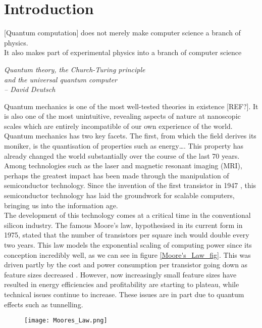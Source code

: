 \section{Introduction}


\epigraph{[Quantum computation] does not merely make computer science
a branch of physics. \\ It also makes part of experimental physics into a branch of computer science}{\textit{Quantum theory, the Church-Turing principle \\ and the universal
quantum computer \\ -- David Deutsch}}

Quantum mechanics is one of the most well-tested theories in existence [REF?]. It is also one of the most unintuitive, revealing aspects of nature at nanoscopic scales which are entirely incompatible of our own experience of the world. \\

Quantum mechanics has two key facets. The first, from which the field derives its moniker, is the quantisation of properties such as energy\ldots. This property has already changed the world substantially over the course of the last 70 years. Among technologies such as the laser and magnetic resonant imaging (MRI), perhaps the greatest impact has been made through the manipulation of semiconductor technology. Since the invention of the first transistor in 1947 \cite{Bardeen1948}, this semiconductor technology has laid the groundwork for scalable computers, bringing us into the information age. \\

The development of this technology comes at a critical time in the conventional silicon industry. The famous Moore's law, hypothesised in its current form in 1975, stated that the number of transistors per square inch would double every two years. This law models the exponential scaling of computing power since its conception incredibly well, as we can see in figure \autoref{Moore's_Law_fig}. This was driven partly by the cost and power consumption per transistor going down as feature sizes decreased \cite{MooresLawEconomist}.  However, now increasingly small feature sizes have resulted in energy efficiencies and profitability are starting to plateau, while technical issues continue to increase. These issues are in part due to quantum effects such as tunnelling.  \\


\begin{figure}[h!]\label{Moore's_Law_fig}
\centering
\texttt{[image: Moores\_Law.png]}
\end{figure}


